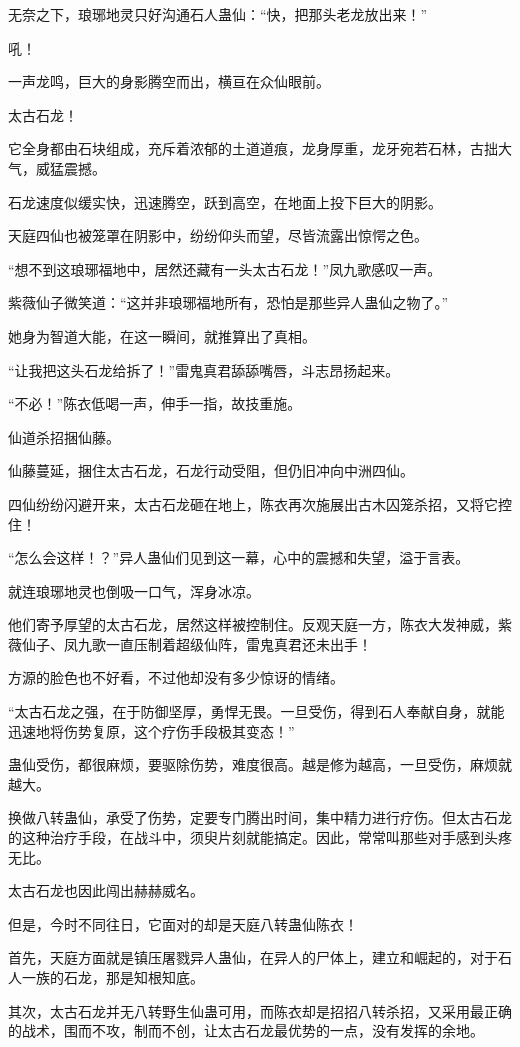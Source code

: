 \begin{this_body}
无奈之下，琅琊地灵只好沟通石人蛊仙：“快，把那头老龙放出来！”

吼！

一声龙鸣，巨大的身影腾空而出，横亘在众仙眼前。

太古石龙！

它全身都由石块组成，充斥着浓郁的土道道痕，龙身厚重，龙牙宛若石林，古拙大气，威猛震撼。

石龙速度似缓实快，迅速腾空，跃到高空，在地面上投下巨大的阴影。

天庭四仙也被笼罩在阴影中，纷纷仰头而望，尽皆流露出惊愕之色。

“想不到这琅琊福地中，居然还藏有一头太古石龙！”凤九歌感叹一声。

紫薇仙子微笑道：“这并非琅琊福地所有，恐怕是那些异人蛊仙之物了。”

她身为智道大能，在这一瞬间，就推算出了真相。

“让我把这头石龙给拆了！”雷鬼真君舔舔嘴唇，斗志昂扬起来。

“不必！”陈衣低喝一声，伸手一指，故技重施。

仙道杀招捆仙藤。

仙藤蔓延，捆住太古石龙，石龙行动受阻，但仍旧冲向中洲四仙。

四仙纷纷闪避开来，太古石龙砸在地上，陈衣再次施展出古木囚笼杀招，又将它控住！

“怎么会这样！？”异人蛊仙们见到这一幕，心中的震撼和失望，溢于言表。

就连琅琊地灵也倒吸一口气，浑身冰凉。

他们寄予厚望的太古石龙，居然这样被控制住。反观天庭一方，陈衣大发神威，紫薇仙子、凤九歌一直压制着超级仙阵，雷鬼真君还未出手！

方源的脸色也不好看，不过他却没有多少惊讶的情绪。

“太古石龙之强，在于防御坚厚，勇悍无畏。一旦受伤，得到石人奉献自身，就能迅速地将伤势复原，这个疗伤手段极其变态！”

蛊仙受伤，都很麻烦，要驱除伤势，难度很高。越是修为越高，一旦受伤，麻烦就越大。

换做八转蛊仙，承受了伤势，定要专门腾出时间，集中精力进行疗伤。但太古石龙的这种治疗手段，在战斗中，须臾片刻就能搞定。因此，常常叫那些对手感到头疼无比。

太古石龙也因此闯出赫赫威名。

但是，今时不同往日，它面对的却是天庭八转蛊仙陈衣！

首先，天庭方面就是镇压屠戮异人蛊仙，在异人的尸体上，建立和崛起的，对于石人一族的石龙，那是知根知底。

其次，太古石龙并无八转野生仙蛊可用，而陈衣却是招招八转杀招，又采用最正确的战术，围而不攻，制而不创，让太古石龙最优势的一点，没有发挥的余地。


\end{this_body}
